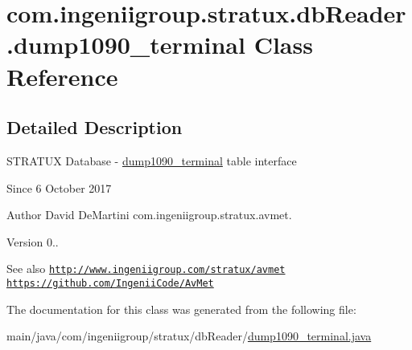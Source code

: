 \hypertarget{classcom_1_1ingeniigroup_1_1stratux_1_1db_reader_1_1dump1090__terminal}{}\section{com.\+ingeniigroup.\+stratux.\+db\+Reader.\+dump1090\+\_\+terminal Class Reference}
\label{classcom_1_1ingeniigroup_1_1stratux_1_1db_reader_1_1dump1090__terminal}


\subsection{Detailed Description}
S\+T\+R\+A\+T\+UX Database -\/ \hyperlink{classcom_1_1ingeniigroup_1_1stratux_1_1db_reader_1_1dump1090__terminal}{dump1090\+\_\+terminal} table interface

\begin{DoxySince}{Since}
6 October 2017 
\end{DoxySince}
\begin{DoxyAuthor}{Author}
David De\+Martini  com.\+ingeniigroup.\+stratux.\+avmet. 
\end{DoxyAuthor}
\begin{DoxyVersion}{Version}
0.. 
\end{DoxyVersion}
\begin{DoxySeeAlso}{See also}
\href{http://www.ingeniigroup.com/stratux/avmet}{\tt http\+://www.\+ingeniigroup.\+com/stratux/avmet}  \href{https://github.com/IngeniiCode/AvMet}{\tt https\+://github.\+com/\+Ingenii\+Code/\+Av\+Met} 
\end{DoxySeeAlso}


The documentation for this class was generated from the following file\+:\begin{DoxyCompactItemize}
\item 
main/java/com/ingeniigroup/stratux/db\+Reader/\hyperlink{dump1090__terminal_8java}{dump1090\+\_\+terminal.\+java}\end{DoxyCompactItemize}
